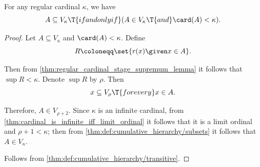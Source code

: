 \begin{proposition}\label{thm:regular_cardinal_stage_inverse_transitivity}
  For any regular cardinal \( \kappa \), we have
  \begin{equation*}
    A \subseteq V_\kappa \T{if and only if} (A \in V_\kappa \T{and} \card(A) < \kappa).
  \end{equation*}
\end{proposition}
\begin{proof}
  \SufficiencySubProof Let \( A \subseteq V_\kappa \) and \( \card(A) < \kappa \). Define
  \begin{equation*}
    R \coloneqq \set{ r(x) \given x \in A }.
  \end{equation*}

  Then from \cref{thm:regular_cardinal_stage_supremum_lemma} it follows that \( \sup R < \kappa \). Denote \( \sup R \) by \( \rho \). Then
  \begin{equation*}
    x \subseteq V_\rho \T{for every} x \in A.
  \end{equation*}

  Therefore, \( A \in V_{\rho + 2} \). Since \( \kappa \) is an infinite cardinal, from \cref{thm:cardinal_is_infinite_iff_limit_ordinal} it follows that it is a limit ordinal and \( \rho + 1 < \kappa \); then from \cref{thm:def:cumulative_hierarchy/subsets} it follows that \( A \in V_\kappa \).

  \NecessitySubProof Follows from \cref{thm:def:cumulative_hierarchy/transitive}.
\end{proof}

